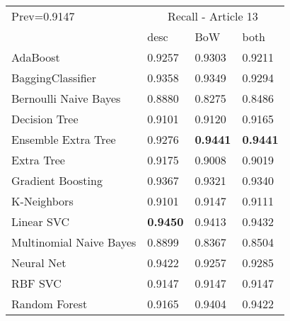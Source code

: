 \begin{tabular}{|l|l|l|l| }
\hline
Prev=0.9147 &  \multicolumn{3}{c|}{Recall - Article 13} \\
\cline{2-4} & desc & BoW & both \\ \hline
AdaBoost                & 0.9257 & 0.9303 & 0.9211\\
BaggingClassifier       & 0.9358 & 0.9349 & 0.9294\\
Bernoulli Naive Bayes   & 0.8880 & 0.8275 & 0.8486\\
Decision Tree           & 0.9101 & 0.9120 & 0.9165\\
Ensemble Extra Tree     & 0.9276 & {\bf 0.9441} & {\bf 0.9441}\\
Extra Tree              & 0.9175 & 0.9008 & 0.9019\\
Gradient Boosting       & 0.9367 & 0.9321 & 0.9340\\
K-Neighbors             & 0.9101 & 0.9147 & 0.9111\\
Linear SVC              & {\bf 0.9450} & 0.9413 & 0.9432\\
Multinomial Naive Bayes & 0.8899 & 0.8367 & 0.8504\\
Neural Net              & 0.9422 & 0.9257 & 0.9285\\
RBF SVC                 & 0.9147 & 0.9147 & 0.9147\\
Random Forest           & 0.9165 & 0.9404 & 0.9422\\
\hline
\end{tabular}